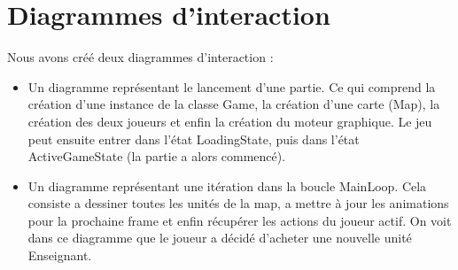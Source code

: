 \section{Diagrammes d'interaction}
Nous avons créé deux diagrammes d'interaction :
\begin{itemize}
\item Un diagramme représentant le lancement d'une partie. Ce qui comprend la création d'une instance de la classe Game, la création d'une carte (Map), la création des deux joueurs et enfin la création du moteur graphique. Le jeu peut ensuite entrer dans l'état LoadingState, puis dans l'état ActiveGameState (la partie a alors commencé).
\item Un diagramme représentant une itération dans la boucle MainLoop. Cela consiste a dessiner toutes les unités de la map, a mettre à jour les animations pour la prochaine frame et enfin récupérer les actions du joueur actif. On voit dans ce diagramme que le joueur a décidé d'acheter une nouvelle unité Enseignant.
\end{itemize}







































